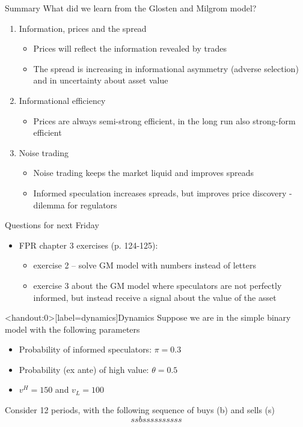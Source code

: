 \documentclass[english,10pt]{beamer}
\begin{document}
\begin{frame}{Summary}
	What did we learn from the Glosten and Milgrom model?
	\begin{enumerate}
		\item Information, prices and the spread
		\begin{itemize}
			\item Prices will reflect the information revealed by trades
			\item The spread is increasing in informational asymmetry (adverse selection) and in uncertainty about asset value
		\end{itemize}
		\item Informational efficiency
		\begin{itemize}
			\item Prices are always semi-strong efficient, in the long run also strong-form efficient
		\end{itemize}
		\item Noise trading
		\begin{itemize}
			\item Noise trading keeps the market liquid and improves spreads
			\item Informed speculation increases spreads, but improves price discovery - dilemma for regulators
		\end{itemize}
	\end{enumerate}
\end{frame}


\begin{frame}{Questions for next Friday}
	\begin{itemize}
		\item FPR chapter 3 exercises (p. 124-125):
		\begin{itemize}
			\item exercise 2 -- solve GM model with numbers instead of letters
			\item exercise 3 about the GM model where speculators are not perfectly informed, but instead receive a signal about the value of the asset
		\end{itemize}
	\end{itemize}
\end{frame}


\begin{frame}<handout:0>[label=dynamics]{Dynamics}
	Suppose we are in the simple binary model with the following parameters
	\begin{itemize}
		\item Probability of informed speculators: $\pi = 0.3$
		\item Probability (ex ante) of high value: $\theta = 0.5$
		\item $v^H=150$ and $v_L=100$
	\end{itemize}
	Consider 12 periods, with the following sequence of buys (b) and sells (s)
	\[
	ssbssssssssss
	\]
\end{frame}
\end{document}
